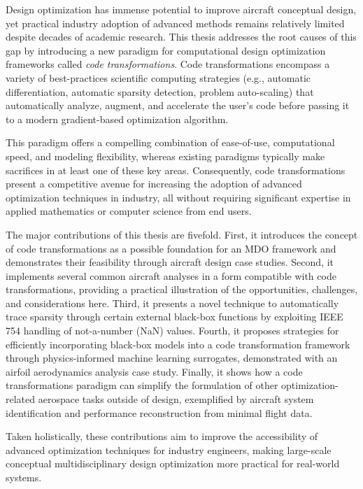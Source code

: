 Design optimization has immense potential to improve aircraft conceptual design, yet practical industry adoption of advanced methods remains relatively limited despite decades of academic research. This thesis addresses the root causes of this gap by introducing a new paradigm for computational design optimization frameworks called \textit{code transformations}. Code transformations encompass a variety of best-practices scientific computing strategies (e.g., automatic differentiation, automatic sparsity detection, problem auto-scaling) that automatically analyze, augment, and accelerate the user's code before passing it to a modern gradient-based optimization algorithm.

This paradigm offers a compelling combination of ease-of-use, computational speed, and modeling flexibility, whereas existing paradigms typically make sacrifices in at least one of these key areas. Consequently, code transformations present a competitive avenue for increasing the adoption of advanced optimization techniques in industry, all without requiring significant expertise in applied mathematics or computer science from end users.

The major contributions of this thesis are fivefold. First, it introduces the concept of code transformations as a possible foundation for an MDO framework and demonstrates their feasibility through aircraft design case studies. Second, it implements several common aircraft analyses in a form compatible with code transformations, providing a practical illustration of the opportunities, challenges, and considerations here. Third, it presents a novel technique to automatically trace sparsity through certain external black-box functions by exploiting IEEE 754 handling of not-a-number (NaN) values. Fourth, it proposes strategies for efficiently incorporating black-box models into a code transformation framework through physics-informed machine learning surrogates, demonstrated with an airfoil aerodynamics analysis case study. Finally, it shows how a code transformations paradigm can simplify the formulation of other optimization-related aerospace tasks outside of design, exemplified by aircraft system identification and performance reconstruction from minimal flight data.

Taken holistically, these contributions aim to improve the accessibility of advanced optimization techniques for industry engineers, making large-scale conceptual multidisciplinary design optimization more practical for real-world systems.